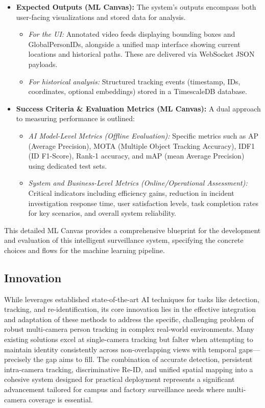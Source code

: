 \begin{itemize}
    \item \textbf{Expected Outputs (ML Canvas):}
        The system's outputs encompass both user-facing visualizations and stored data for analysis.
        \begin{itemize}
            \item \textit{For the UI:} Annotated video feeds displaying bounding boxes and GlobalPersonIDs, alongside a unified map interface showing current locations and historical paths. These are delivered via WebSocket JSON payloads.
            \item \textit{For historical analysis:} Structured tracking events (timestamp, IDs, coordinates, optional embeddings) stored in a TimescaleDB database.
        \end{itemize}

    \item \textbf{Success Criteria \& Evaluation Metrics (ML Canvas):}
        A dual approach to measuring performance is outlined:
        \begin{itemize}
            \item \textit{AI Model-Level Metrics (Offline Evaluation):} Specific metrics such as AP (Average Precision), MOTA (Multiple Object Tracking Accuracy), IDF1 (ID F1-Score), Rank-1 accuracy, and mAP (mean Average Precision) using dedicated test sets.
            \item \textit{System and Business-Level Metrics (Online/Operational Assessment):} Critical indicators including efficiency gains, reduction in incident investigation response time, user satisfaction levels, task completion rates for key scenarios, and overall system reliability.
        \end{itemize}
\end{itemize}
This detailed ML Canvas provides a comprehensive blueprint for the development and evaluation of this intelligent surveillance system, specifying the concrete choices and flows for the machine learning pipeline.


\subsection{Innovation}
\label{subsection:innovation}
While \usevar{\srsTitle} leverages established state-of-the-art AI techniques for tasks like detection, tracking, and re-identification, its core innovation lies in the effective integration and adaptation of these methods to address the specific, challenging problem of robust multi-camera person tracking in complex real-world environments. Many existing solutions excel at single-camera tracking but falter when attempting to maintain identity consistently across non-overlapping views with temporal gaps—precisely the gap \usevar{\srsTitle} aims to fill. The combination of accurate detection, persistent intra-camera tracking, discriminative Re-ID, and unified spatial mapping into a cohesive system designed for practical deployment represents a significant advancement tailored for campus and factory surveillance needs where multi-camera coverage is essential.


